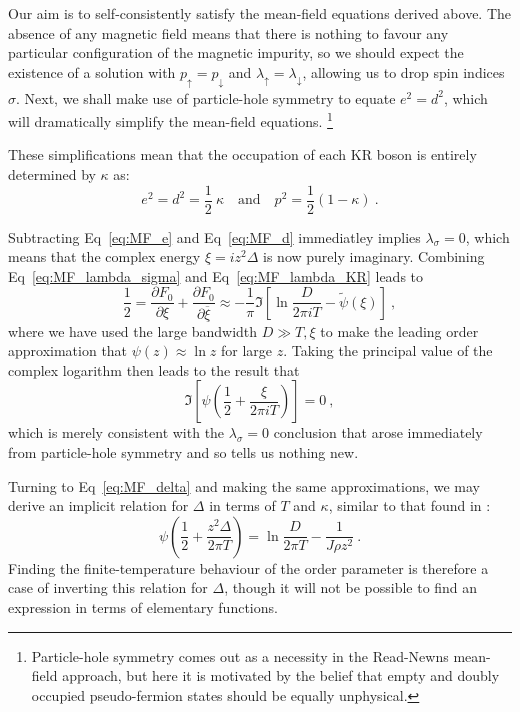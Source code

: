 \documentclass[12pt]{article}
\begin{document}
Our aim is to self-consistently satisfy the mean-field equations derived above. The absence of any magnetic field means that there is nothing to favour any particular configuration of the magnetic impurity, so we should expect the existence of a solution with $ p_{\uparrow} = p_{\downarrow} $ and $ \lambda_{\uparrow} = \lambda_{\downarrow} $, allowing us to drop spin indices $ \sigma $. Next, we shall make use of particle-hole symmetry to equate $ e^2 = d^2 $, which will dramatically simplify the mean-field equations. \footnote{Particle-hole symmetry comes out as a necessity in the Read-Newns mean-field approach, but here it is motivated by the belief that empty and doubly occupied pseudo-fermion states should be equally unphysical.}


These simplifications mean that the occupation of each KR boson is entirely determined by $ \kappa $ as:
\begin{equation}
e^2 = d^2 = \frac{1}{2} ~ \kappa \quad \text{and} \quad p^2 = \frac{1}{2} (1 - \kappa) ~ .
\end{equation}

Subtracting Eq~\eqref{eq:MF_e} and Eq~\eqref{eq:MF_d} immediatley implies $ \lambda_{\sigma} = 0 $, which means that the complex energy $ \xi = i z^2 \Delta $ is now purely imaginary. Combining Eq~\eqref{eq:MF_lambda_sigma} and Eq~\eqref{eq:MF_lambda_KR} leads to $$ \frac{1}{2} = \frac{\partial F_0}{\partial \xi} + \frac{\partial F_0}{\partial \overline{\xi}} \approx - \frac{1}{\pi} \Im{\left[ \ln{\frac{D}{2 \pi i T}} - \widetilde{\psi}(\xi) \right]} ~ , $$ where we have used the large bandwidth $ D \gg T, \xi $ to make the leading order approximation that $ \psi(z) \approx \ln{z} $ for large $ z $. Taking the principal value of the complex logarithm then leads to the result that $$ \Im{\left[ \psi \left( \frac{1}{2} + \frac{\xi}{2 \pi i T} \right) \right] = 0} ~ , $$ which is merely consistent with the $ \lambda_{\sigma} = 0 $ conclusion that arose immediately from particle-hole symmetry and so tells us nothing new.

Turning to Eq~\eqref{eq:MF_delta} and making the same approximations, we may derive an implicit relation for $ \Delta $ in terms of $ T $ and $ \kappa $, similar to that found in \cite{ManyBodyPhysics}:
\begin{equation}
\psi \left( \frac{1}{2} + \frac{z^2 \Delta}{2 \pi T} \right) = \ln{\frac{D}{2 \pi T}} - \frac{1}{J \rho z^2} ~ .
\label{eq:soln_delta}
\end{equation}
Finding the finite-temperature behaviour of the order parameter is therefore a case of inverting this relation for $ \Delta $, though it will not be possible to find an expression in terms of elementary functions. %
\end{document}
